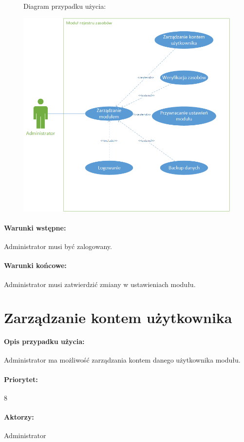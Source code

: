 \documentclass[11pt, a4paper, oneside]{report}
\begin{document}
\begin{figure}[H]
Diagram przypadku użycia:

\centering
\includegraphics[scale=1]{Zarzadzanie_modulem.png}
\end{figure}

\paragraph{Warunki wstępne:} Administrator musi być zalogowany.
\paragraph{Warunki końcowe:} Administrator musi zatwierdzić zmiany w ustawieniach modułu.

\section{Zarządzanie kontem użytkownika}
\paragraph{Opis przypadku użycia:} Administrator ma możliwość zarządzania kontem danego użytkownika modułu.
\paragraph{Priorytet:} 8
\paragraph{Aktorzy:} Administrator
\end{document}
